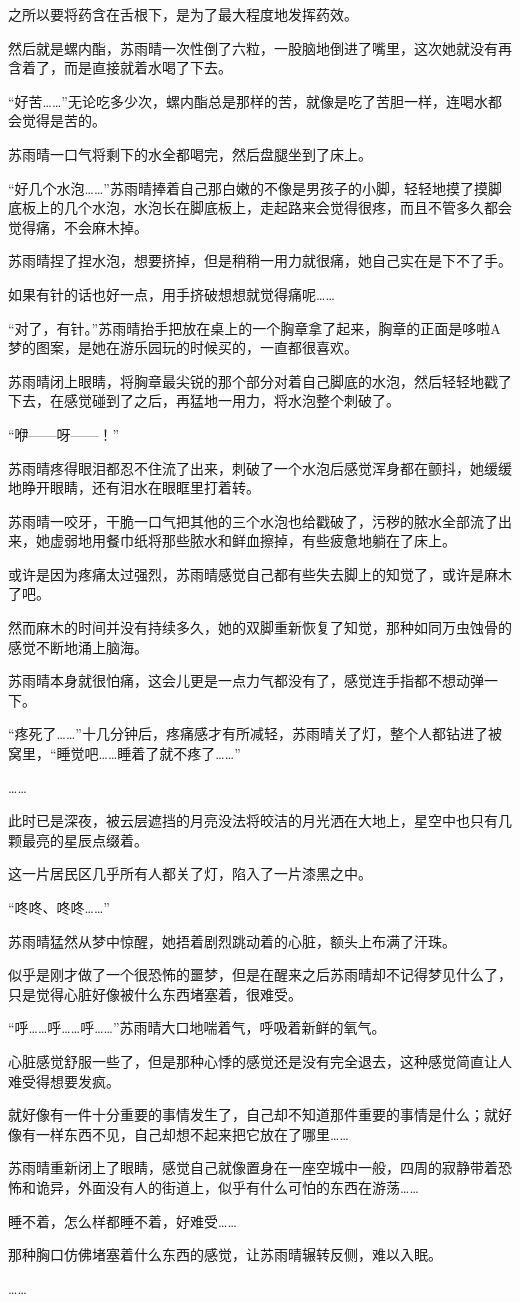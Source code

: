 之所以要将药含在舌根下，是为了最大程度地发挥药效。

然后就是螺内酯，苏雨晴一次性倒了六粒，一股脑地倒进了嘴里，这次她就没有再含着了，而是直接就着水喝了下去。

“好苦……”无论吃多少次，螺内酯总是那样的苦，就像是吃了苦胆一样，连喝水都会觉得是苦的。

苏雨晴一口气将剩下的水全都喝完，然后盘腿坐到了床上。

“好几个水泡……”苏雨晴捧着自己那白嫩的不像是男孩子的小脚，轻轻地摸了摸脚底板上的几个水泡，水泡长在脚底板上，走起路来会觉得很疼，而且不管多久都会觉得痛，不会麻木掉。

苏雨晴捏了捏水泡，想要挤掉，但是稍稍一用力就很痛，她自己实在是下不了手。

如果有针的话也好一点，用手挤破想想就觉得痛呢……

“对了，有针。”苏雨晴抬手把放在桌上的一个胸章拿了起来，胸章的正面是哆啦A梦的图案，是她在游乐园玩的时候买的，一直都很喜欢。

苏雨晴闭上眼睛，将胸章最尖锐的那个部分对着自己脚底的水泡，然后轻轻地戳了下去，在感觉碰到了之后，再猛地一用力，将水泡整个刺破了。

“咿——呀——！”

苏雨晴疼得眼泪都忍不住流了出来，刺破了一个水泡后感觉浑身都在颤抖，她缓缓地睁开眼睛，还有泪水在眼眶里打着转。

苏雨晴一咬牙，干脆一口气把其他的三个水泡也给戳破了，污秽的脓水全部流了出来，她虚弱地用餐巾纸将那些脓水和鲜血擦掉，有些疲惫地躺在了床上。

或许是因为疼痛太过强烈，苏雨晴感觉自己都有些失去脚上的知觉了，或许是麻木了吧。

然而麻木的时间并没有持续多久，她的双脚重新恢复了知觉，那种如同万虫蚀骨的感觉不断地涌上脑海。

苏雨晴本身就很怕痛，这会儿更是一点力气都没有了，感觉连手指都不想动弹一下。

“疼死了……”十几分钟后，疼痛感才有所减轻，苏雨晴关了灯，整个人都钻进了被窝里，“睡觉吧……睡着了就不疼了……”

……

此时已是深夜，被云层遮挡的月亮没法将皎洁的月光洒在大地上，星空中也只有几颗最亮的星辰点缀着。

这一片居民区几乎所有人都关了灯，陷入了一片漆黑之中。

“咚咚、咚咚……”

苏雨晴猛然从梦中惊醒，她捂着剧烈跳动着的心脏，额头上布满了汗珠。

似乎是刚才做了一个很恐怖的噩梦，但是在醒来之后苏雨晴却不记得梦见什么了，只是觉得心脏好像被什么东西堵塞着，很难受。

“呼……呼……呼……”苏雨晴大口地喘着气，呼吸着新鲜的氧气。

心脏感觉舒服一些了，但是那种心悸的感觉还是没有完全退去，这种感觉简直让人难受得想要发疯。

就好像有一件十分重要的事情发生了，自己却不知道那件重要的事情是什么；就好像有一样东西不见，自己却想不起来把它放在了哪里……

苏雨晴重新闭上了眼睛，感觉自己就像置身在一座空城中一般，四周的寂静带着恐怖和诡异，外面没有人的街道上，似乎有什么可怕的东西在游荡……

睡不着，怎么样都睡不着，好难受……

那种胸口仿佛堵塞着什么东西的感觉，让苏雨晴辗转反侧，难以入眠。

……
